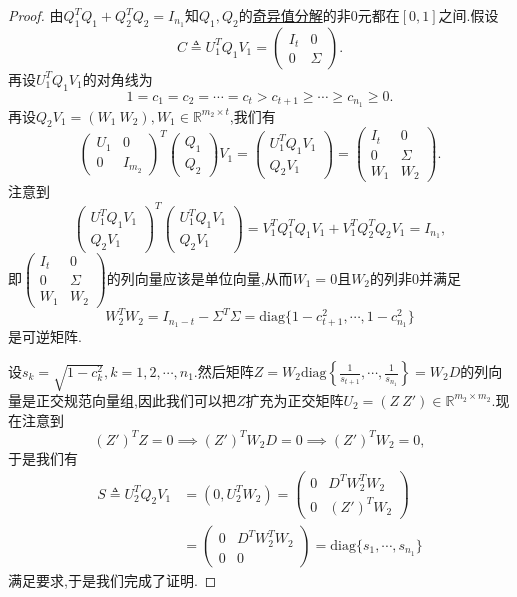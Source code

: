 \documentclass[../../main.tex]{subfiles}
\begin{document}
\begin{proof}
由\( Q_1^T Q_1 + Q_2^T Q_2 = I_{n_1} \)知\( Q_1, Q_2 \)的\hyperref[theorem:奇异值分解]{奇异值分解}的非0元都在\([0, 1]\)之间.假设
\[
C \triangleq U_1^T Q_1 V_1 = \begin{pmatrix}
I_t & 0 \\
0 & \Sigma
\end{pmatrix}.
\]
再设\( U_1^T Q_1 V_1 \)的对角线为
\[
1 = c_1 = c_2 = \cdots = c_t > c_{t + 1} \geqslant  \cdots \geqslant  c_{n_1} \geqslant  0.
\]
再设\( Q_2 V_1 = (W_1\ W_2), W_1 \in \mathbb{R}^{m_2 \times t} \),我们有
\[
\begin{pmatrix}
U_1 & 0 \\
0 & I_{m_2}
\end{pmatrix}^T \begin{pmatrix}
Q_1 \\
Q_2
\end{pmatrix} V_1 = \begin{pmatrix}
U_1^T Q_1 V_1 \\
Q_2 V_1
\end{pmatrix} = \begin{pmatrix}
I_t & 0 \\
0 & \Sigma \\
W_1 & W_2
\end{pmatrix}.
\]
注意到
\[
\begin{pmatrix}
U_1^T Q_1 V_1 \\
Q_2 V_1
\end{pmatrix}^T \begin{pmatrix}
U_1^T Q_1 V_1 \\
Q_2 V_1
\end{pmatrix} = V_1^T Q_1^T Q_1 V_1 + V_1^T Q_2^T Q_2 V_1 = I_{n_1},
\]
即\( \begin{pmatrix}
I_t & 0 \\
0 & \Sigma \\
W_1 & W_2
\end{pmatrix} \)的列向量应该是单位向量,从而\( W_1 = 0 \)且\( W_2 \)的列非0并满足
\[
W_2^T W_2 = I_{n_1 - t} - \Sigma^T \Sigma = \text{diag}\{1 - c_{t + 1}^2, \cdots, 1 - c_{n_1}^2\}
\]
是可逆矩阵.

设\( s_k = \sqrt{1 - c_k^2}, k = 1, 2, \cdots, n_1 \).然后矩阵\( Z = W_2 \text{diag}\left\{ \frac{1}{s_{t + 1}}, \cdots, \frac{1}{s_{n_1}} \right\} = W_2 D \)的列向量是正交规范向量组,因此我们可以把\( Z \)扩充为正交矩阵\( U_2 = (Z\ Z') \in \mathbb{R}^{m_2 \times m_2} \).现在注意到
\[
(Z')^T Z = 0 \implies (Z')^T W_2 D = 0 \implies (Z')^T W_2 = 0,
\]
于是我们有
\[
\begin{aligned}
S \triangleq U_2^T Q_2 V_1 &= (0, U_2^T W_2) = \begin{pmatrix}
0 & D^T W_2^T W_2 \\
0 & (Z')^T W_2
\end{pmatrix} \\
&= \begin{pmatrix}
0 & D^T W_2^T W_2 \\
0 & 0
\end{pmatrix} = \text{diag}\{s_1, \cdots, s_{n_1}\}
\end{aligned}
\]
满足要求,于是我们完成了证明.

\end{proof}
\end{document}
